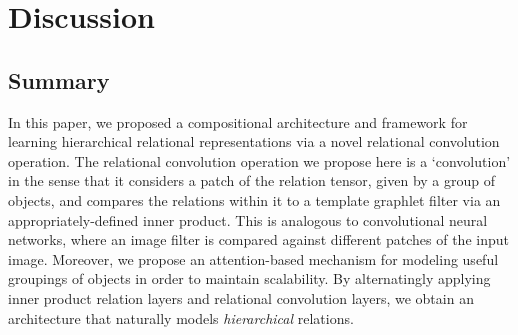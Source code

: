 
\section{Discussion}\label{sec:discussion}
\subsection*{Summary}
In this paper, we proposed a compositional architecture and framework for learning hierarchical relational representations via a novel relational convolution operation. The relational convolution operation we propose here is a `convolution' in the sense that it considers a patch of the relation tensor, given by a group of objects, and compares the relations within it to a template graphlet filter via an appropriately-defined inner product. This is analogous to convolutional neural networks, where an image filter is compared against different patches of the input image. Moreover, we propose an attention-based mechanism for modeling useful groupings of objects in order to maintain scalability. By alternatingly applying inner product relation layers and relational convolution layers, we obtain an architecture that naturally models \textit{hierarchical} relations.


